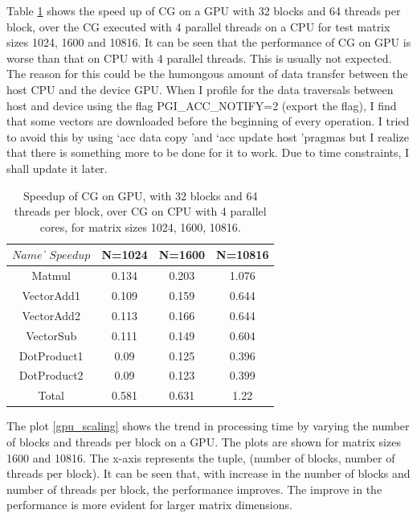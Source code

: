 \documentclass{article}
\begin{document}
\begin{spacing}{1.1}
Table \ref{gpu_speedup} shows the speed up of CG on a GPU with 32 blocks and 64 threads per block, over the CG executed with 4 parallel threads on a CPU for test matrix sizes  1024, 1600 and 10816. It can be seen that the performance of CG on GPU is worse than that on CPU with 4 parallel threads. This is usually not expected. The reason for this could be the humongous amount of data transfer between the host CPU and the device GPU. When I profile for the data traversals between host and device using the flag PGI\_ACC\_NOTIFY=2 (export the flag), I find that some vectors are downloaded before the beginning of every operation. I tried to avoid this by using \lq acc data copy \rq  and \lq acc update host \rq  pragmas but I realize that there is something more to be done for it to work. Due to time constraints, I shall update it later.
    \begin{table}[H]
\begin{center}
 \begin{tabular}{| c | c|c|c|} 
 \hline
$Name$ \| $Speedup$ & N=1024 & N=1600 & N=10816    \\ %
 \hline
Matmul & 0.134 & 0.203 &1.076 \\ %
VectorAdd1 & 0.109 &0.159 &0.644 \\ %
VectorAdd2 & 0.113& 0.166& 0.644\\ %
VectorSub &0.111 &0.149 &0.604\\ %
DotProduct1 & 0.09& 0.125 & 0.396\\ %
DotProduct2 & 0.09& 0.123&0.399\\ %
\cline{2-4}
Total & 0.581& 0.631 & 1.22\\%
 \hline
\end{tabular}%
\end{center}
\caption{\label{gpu_speedup} Speedup of CG on GPU, with 32 blocks and 64 threads per block, over CG on CPU with 4 parallel cores, for matrix sizes 1024, 1600, 10816.   } 
\end{table}

The plot \ref{gpu_scaling} shows the trend in processing time by varying the number of blocks and threads per block on a GPU. The plots are shown for matrix sizes 1600 and 10816. The x-axis represents the tuple, (number of blocks, number of threads per block). It can be seen that, with increase in the number of blocks and number of threads per block, the performance improves. The improve in the performance is more evident for larger matrix dimensions.


\end{spacing}
\end{document}
